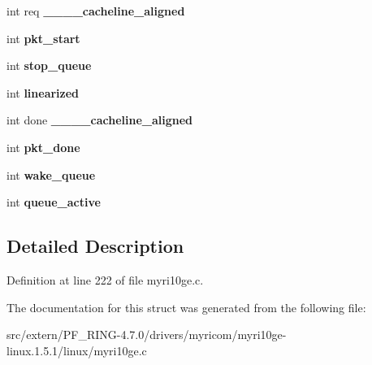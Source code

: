 \begin{DoxyCompactItemize}
\item 
\hypertarget{structmyri10ge__tx__buf_a4a9be3f1852a95857a0fbffe4212b6b3}{
int req {\bfseries \_\-\_\-\_\-\_\-cacheline\_\-aligned}}
\label{structmyri10ge__tx__buf_a4a9be3f1852a95857a0fbffe4212b6b3}

\item 
\hypertarget{structmyri10ge__tx__buf_a180f2a726341fc4ac0f7db6b1d9ba0f6}{
int {\bfseries pkt\_\-start}}
\label{structmyri10ge__tx__buf_a180f2a726341fc4ac0f7db6b1d9ba0f6}

\item 
\hypertarget{structmyri10ge__tx__buf_a7a0625f2efb4080444c64e071050e40f}{
int {\bfseries stop\_\-queue}}
\label{structmyri10ge__tx__buf_a7a0625f2efb4080444c64e071050e40f}

\item 
\hypertarget{structmyri10ge__tx__buf_a52d345b88030fe2c219469619625ea7f}{
int {\bfseries linearized}}
\label{structmyri10ge__tx__buf_a52d345b88030fe2c219469619625ea7f}

\item 
\hypertarget{structmyri10ge__tx__buf_aba41686c0736c3a15fa6e91dd63377aa}{
int done {\bfseries \_\-\_\-\_\-\_\-cacheline\_\-aligned}}
\label{structmyri10ge__tx__buf_aba41686c0736c3a15fa6e91dd63377aa}

\item 
\hypertarget{structmyri10ge__tx__buf_a0ddb134d01103291c131afb44906dc2f}{
int {\bfseries pkt\_\-done}}
\label{structmyri10ge__tx__buf_a0ddb134d01103291c131afb44906dc2f}

\item 
\hypertarget{structmyri10ge__tx__buf_ae9013bbcbc468d375d38003dda76ccb0}{
int {\bfseries wake\_\-queue}}
\label{structmyri10ge__tx__buf_ae9013bbcbc468d375d38003dda76ccb0}

\item 
\hypertarget{structmyri10ge__tx__buf_ad1eb7d0aa11d5afaf603b85f1a3e9209}{
int {\bfseries queue\_\-active}}
\label{structmyri10ge__tx__buf_ad1eb7d0aa11d5afaf603b85f1a3e9209}

\end{DoxyCompactItemize}


\subsection{Detailed Description}


Definition at line 222 of file myri10ge.c.



The documentation for this struct was generated from the following file:\begin{DoxyCompactItemize}
\item 
src/extern/PF\_\-RING-\/4.7.0/drivers/myricom/myri10ge-\/linux.1.5.1/linux/myri10ge.c\end{DoxyCompactItemize}

